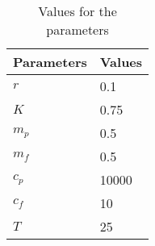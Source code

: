 \begin{table}
	\centering
	\begin{tabular}{ll}
		\toprule
			\textbf{Parameters} & \textbf{Values}
            \\
        \midrule
            $r$ & 0.1
            \\
        	$K$ & 0.75
			\\
            $m_p$ & 0.5
            \\
     	    $m_f$ & 0.5
 			\\
     	    $c_p$ & 10000
     	    \\
     	    $c_f$ & 10
            \\
     	    $T$ & 25
     	    \\
		\bottomrule
    \end{tabular}
	\caption{Values for the parameters}
\end{table}